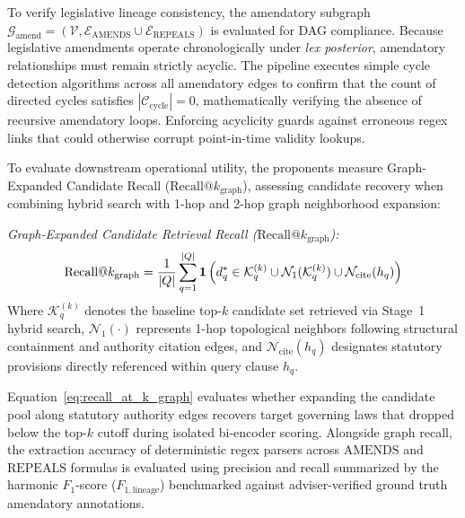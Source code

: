     To verify legislative lineage consistency, the amendatory subgraph $\mathcal{G}_{\text{amend}} = (\mathcal{V}, \mathcal{E}_{\text{AMENDS}} \cup \mathcal{E}_{\text{REPEALS}})$ is evaluated for DAG compliance. Because legislative amendments operate chronologically under \textit{lex posterior}, amendatory relationships must remain strictly acyclic. The pipeline executes simple cycle detection algorithms across all amendatory edges to confirm that the count of directed cycles satisfies $|\mathcal{C}_{\text{cycle}}| = 0$, mathematically verifying the absence of recursive amendatory loops. Enforcing acyclicity guards against erroneous regex links that could otherwise corrupt point-in-time validity lookups.

    To evaluate downstream operational utility, the proponents measure Graph-Expanded Candidate Recall ($\text{Recall@}k_{\text{graph}}$), assessing candidate recovery when combining hybrid search with 1-hop and 2-hop graph neighborhood expansion:

    \noindent\textit{Graph-Expanded Candidate Retrieval Recall ($\text{Recall@}k_{\text{graph}}$):}
    \begin{equation}
        \text{Recall@}k_{\text{graph}} = \frac{1}{|Q|} \sum_{q=1}^{|Q|} \mathbf{1}\left(d_q^* \in \mathcal{K}_q^{(k)} \cup \mathcal{N}_1(\mathcal{K}_q^{(k)}) \cup \mathcal{N}_{\text{cite}}(h_q)\right)
        \label{eq:recall_at_k_graph}
        \eqcaption{Graph-Expanded Candidate Retrieval Recall ($\text{Recall@}k_{\text{graph}}$)}
    \end{equation}
    \noindent Where $\mathcal{K}_q^{(k)}$ denotes the baseline top-$k$ candidate set retrieved via Stage~1 hybrid search, $\mathcal{N}_1(\cdot)$ represents 1-hop topological neighbors following structural containment and authority citation edges, and $\mathcal{N}_{\text{cite}}(h_q)$ designates statutory provisions directly referenced within query clause $h_q$.

    Equation~\ref{eq:recall_at_k_graph} evaluates whether expanding the candidate pool along statutory authority edges recovers target governing laws that dropped below the top-$k$ cutoff during isolated bi-encoder scoring. Alongside graph recall, the extraction accuracy of deterministic regex parsers across $\text{AMENDS}$ and $\text{REPEALS}$ formulas is evaluated using precision and recall summarized by the harmonic $F_1$-score ($F_{1, \text{lineage}}$) benchmarked against adviser-verified ground truth amendatory annotations.

